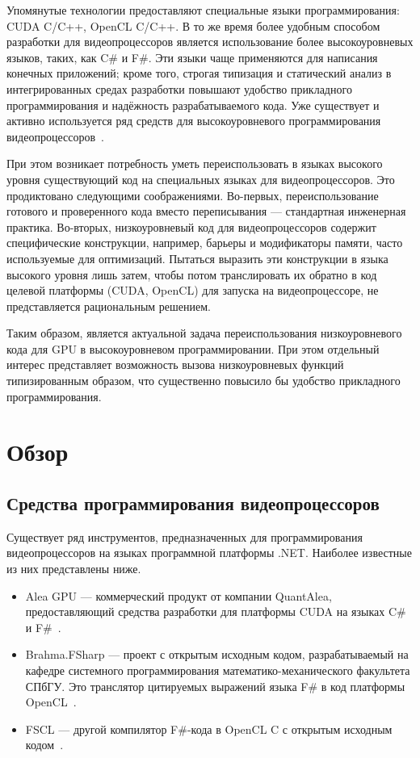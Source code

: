 Упомянутые технологии предоставляют специальные языки программирования: CUDA C/C++, OpenCL C/C++. В то же время более удобным способом разработки для видеопроцессоров является использование более высокоуровневых языков, таких, как C\# и F\#. Эти языки чаще применяются для написания конечных приложений; кроме того, строгая типизация и статический анализ в интегрированных средах разработки повышают удобство прикладного программирования и надёжность разрабатываемого кода. Уже существует и активно используется ряд средств для высокоуровневого программирования видеопроцессоров~\cite{Brahma_FSharp, FSCL, AleaGPU}.

При этом возникает потребность уметь переиспользовать в языках высокого уровня существующий код на специальных языках для видеопроцессоров. Это продиктовано следующими соображениями. Во-первых, переиспользование готового и проверенного кода вместо переписывания --- стандартная инженерная практика. Во-вторых, низкоуровневый код для видеопроцессоров содержит специфические конструкции, например, барьеры и модификаторы памяти, часто используемые для оптимизаций. Пытаться выразить эти конструкции в языка высокого уровня лишь затем, чтобы потом транслировать их обратно в код целевой платформы (CUDA, OpenCL) для запуска на видеопроцессоре, не представляется рациональным решением.

Таким образом, является актуальной задача переиспользования низкоуровневого кода для GPU в высокоуровневом программировании. При этом отдельный интерес представляет возможность вызова низкоуровневых функций типизированным образом, что существенно повысило бы удобство прикладного программирования.

\section{Обзор}

\subsection{Средства программирования видеопроцессоров}
Существует ряд инструментов, предназначенных для программирования видеопроцессоров на языках программной платформы .NET. Наиболее известные из них представлены ниже.
\begin{itemize}
    \item Alea GPU --- коммерческий продукт от компании QuantAlea, предоставляющий средства разработки для платформы CUDA на языках C\# и F\#~\cite{AleaGPU}.
    \item Brahma.FSharp --- проект с открытым исходным кодом, разрабатываемый на кафедре системного программирования математико-механического факультета СПбГУ. Это транслятор цитируемых выражений языка F\# в код платформы OpenCL~\cite{Brahma_FSharp}.
    \item FSCL --- другой компилятор F\#-кода в OpenCL C с открытым исходным кодом~\cite{FSCL}.
\end{itemize}

